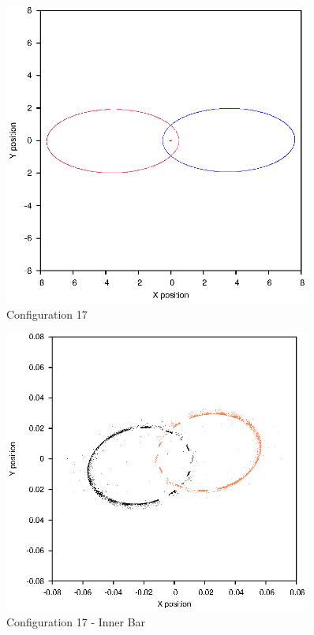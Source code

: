 \documentclass[a4paper,12pt]{article}
\begin{document}
\begin{figure}[H]
\centering
\includegraphics[width=0.9\textwidth]{./results/07-1-07-15/Orbit.eps}
\caption{Configuration 17}
\label{fig:config17}
\end{figure}
\begin{figure}[H]
\centering
\includegraphics[width=0.9\textwidth]{./results/07-1-07-15/Inner.eps}
\caption{Configuration 17 - Inner Bar}
\label{fig:config17i}
\end{figure}
\end{document}
